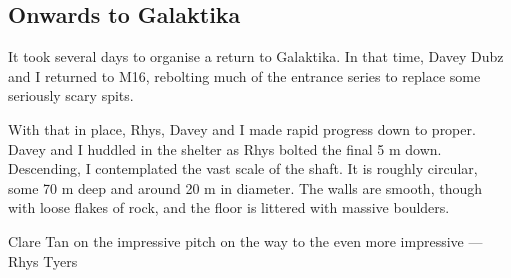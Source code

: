 \subsection{Onwards to Galaktika}

It took several days to organise a return to Galaktika. In that time, Davey Dubz and I returned to M16, rebolting much of the entrance series to replace some seriously scary spits. 

With that in place, Rhys, Davey and I made rapid progress down to  proper. Davey and I huddled in the shelter as Rhys bolted the final 5 m down. Descending, I contemplated the vast scale of the shaft. It is roughly circular, some 70 m deep and around 20 m in diameter. The walls are smooth, though with loose flakes of rock, and the floor is littered with massive boulders.

\begin{marginfigure}
\label{Ta Mokra}
\caption{Clare Tan on the impressive pitch on the way to the even more impressive \protect{} --- Rhys Tyers}
\end{marginfigure}



